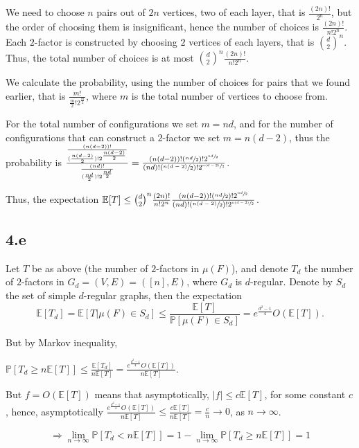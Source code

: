 \documentclass{article}
\begin{document}
We need to choose $n$ pairs out of $2n$ vertices, two of each layer, that is $\frac{(2n)!}{2^n}$, but the order of choosing them is insignificant, hence the number of choices is $\frac{(2n)!}{n!2^n}$.
Each $2$-factor is constructed by choosing $2$ vertices of each layers, that is $\binom{d}{2}^n$. Thus, the total number of choices is at most $\binom{d}{2}^n\frac{(2n)!}{n!2^n}$.

We calculate the probability, using the number of choices for pairs that we found earlier, that is $\frac{m!}{\frac{m}{2}!2^{\frac{m}{2}}}$, where $m$ is the total number of vertices to choose from.

For the total number of configurations we set $m=nd$, and for the number of configurations that can construct a $2$-factor we set $m=n(d-2)$, thus the probability is $
\frac{\frac{(n(d-2))!}{(\frac{n(d-2)}{2})!2^{\frac{n(d-2)}{2}}}}{\frac{(nd)!}{(\frac{nd}{2})!2^{\frac{nd}{2}}}}=\frac{(n(d-2))!(\sfrac{nd}{2})!2^{\sfrac{nd}{2}}}{(nd)!(\sfrac{n(d-2)}{2})!2^{\sfrac{n(d-2)}{2}}}$.

Thus, the expectation $\mathbb{E}[T]\leq\binom{d}{2}^n\frac{(2n)!}{n!2^n}\frac{(n(d-2))!(\sfrac{nd}{2})!2^{\sfrac{nd}{2}}}{(nd)!(\sfrac{n(d-2)}{2})!2^{\sfrac{n(d-2)}{2}}}$.

\subsection*{4.e}
Let $T$ be as above (the number of $2$-factors in $\mu(F)$), and denote $T_d$ the number of $2$-factors in $G_d=(V,E)=([n],E)$, where $G_d$ is $d$-regular. Denote by $S_d$ the set of simple $d$-regular graphs, then the expectation 
\[\mathbb{E}[T_d]=\mathbb{E}[T|\mu(F)\in{S_d}]\leq\frac{\mathbb{E}[T]}{\mathbb{P}[\mu(F)\in{S_d}]}=e^{\frac{d^2-1}{4}}O(\mathbb{E}[T]).\]

But by Markov inequality,

$\mathbb{P}[T_d\geq{n\mathbb{E}[T]}]\leq\frac{\mathbb{E}[T_d]}{n\mathbb{E}[T]}=\frac{e^{\frac{d^2-1}{4}}O(\mathbb{E}[T])}{n\mathbb{E}[T]}$.

But $f=O(\mathbb{E}[T])$ means that asymptotically, $|f|\leq{c\mathbb{E}[T]}$, for some constant $c$, hence, asymptotically $\frac{e^{\frac{d^2-1}{4}}O(\mathbb{E}[T])}{n\mathbb{E}[T]}\leq\frac{c\mathbb{E}[T]}{n\mathbb{E}[T]}=\frac{c}{n}\rightarrow{0}$, as $n\rightarrow\infty$.

\[
\Rightarrow\lim_{n\rightarrow\infty}\mathbb{P}[T_d<n\mathbb{E}[T]]=1-\lim_{n\rightarrow\infty}\mathbb{P}[T_d\geq{n\mathbb{E}[T]}]=1
\]
\end{document}
